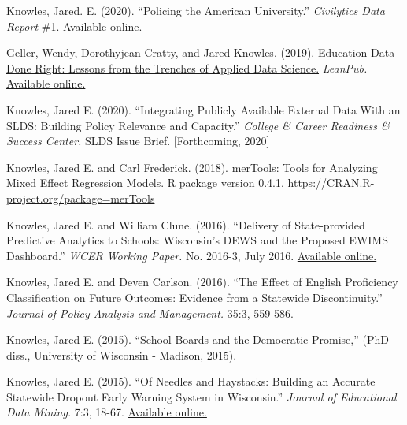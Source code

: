 \documentclass[margin,line]{res}
\begin{document}
\begin{resume}
Knowles, Jared. E. (2020). ``Policing the American University.'' \emph{Civilytics 
Data Report} \#1. \href{https://www.civilytics.com/publication/cpd-report/}{Available online.}

Geller, Wendy, Dorothyjean Cratty, and Jared Knowles. (2019). \uline{Education Data Done Right: Lessons from the Trenches of Applied Data Science.} \emph{LeanPub.} 
\href{https://www.eddatadoneright.com}{Available online.}

Knowles, Jared E. (2020). ``Integrating Publicly Available External Data With an SLDS: Building 
Policy Relevance and Capacity.'' \emph{College & Career Readiness & Success Center.} 
SLDS Issue Brief. [Forthcoming, 2020]

Knowles, Jared E. and Carl Frederick. (2018). merTools: Tools for Analyzing Mixed 
Effect Regression Models. R package version 0.4.1. 
\url{https://CRAN.R-project.org/package=merTools}

Knowles, Jared E. and William Clune. (2016). ``Delivery of State-provided Predictive
Analytics to Schools: Wisconsin’s DEWS and the Proposed EWIMS Dashboard.'' 
\emph{WCER Working Paper.} No. 2016-3, July 2016. \href{http://wcer-web.ad.education.wisc.edu/docs/working-papers/Working_Paper_No_2016_03.pdf}{Available online.}

Knowles, Jared E. and Deven Carlson. (2016). ``The Effect of English Proficiency Classification 
on Future Outcomes: Evidence from a Statewide Discontinuity.'' \emph{Journal of Policy Analysis 
and Management.} 35:3, 559-586. 

Knowles, Jared E. (2015). ``School Boards and the Democratic Promise,'' (PhD diss., University of 
Wisconsin - Madison, 2015).

Knowles, Jared E. (2015). ``Of Needles and Haystacks: Building an Accurate Statewide 
Dropout Early Warning System in Wisconsin.'' \emph{Journal of Educational Data 
Mining.} 7:3, 18-67. 
\href{http://www.educationaldatamining.org/JEDM/index.php/JEDM/article/view/JEDM082}{Available online.}

\vspace*{3mm}


\end{resume}
\end{document}
